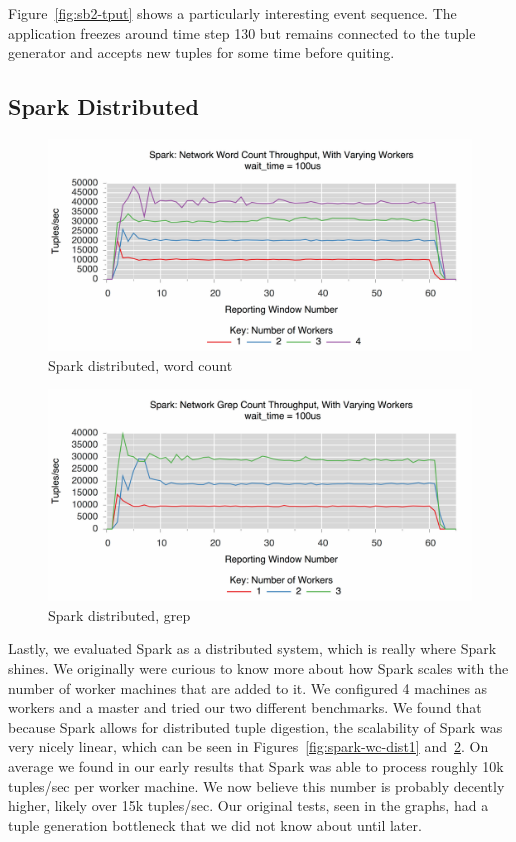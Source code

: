 Figure~\ref{fig:sb2-tput} shows a particularly interesting event sequence. The 
application freezes around time step 130 but remains connected to the tuple generator
and accepts new tuples for some time before quiting.

\subsection{Spark Distributed}
\label{ssec:spark-dist1}

\begin{figure}[t]
\centering
\includegraphics[width=1\linewidth]{figures/spark-wc-dist.pdf}
\caption{Spark distributed, word count}
\label{fig:spark-wc-dist}
\end{figure}


\begin{figure}[t]
\centering
\includegraphics[width=1\linewidth]{figures/spark-grep-dist.pdf}
\caption{Spark distributed, grep}
\label{fig:spark-grep-dist}
\end{figure}

Lastly, we evaluated Spark as a distributed system, which is really where Spark shines. We originally were curious to know more about how Spark scales with the number of worker machines that are added to it. We configured 4 machines as workers and a master and tried our two different benchmarks. We found that because Spark allows for distributed tuple digestion, the scalability of Spark was very nicely linear, which can be seen in Figures~\ref{fig:spark-wc-dist1} and~\ref{fig:spark-grep-dist}. On average we found in our early results that Spark was able to process roughly 10k tuples/sec per worker machine. We now believe this number is probably decently higher, likely over 15k tuples/sec. Our original tests, seen in the graphs, had a tuple generation bottleneck that we did not know about until later.


